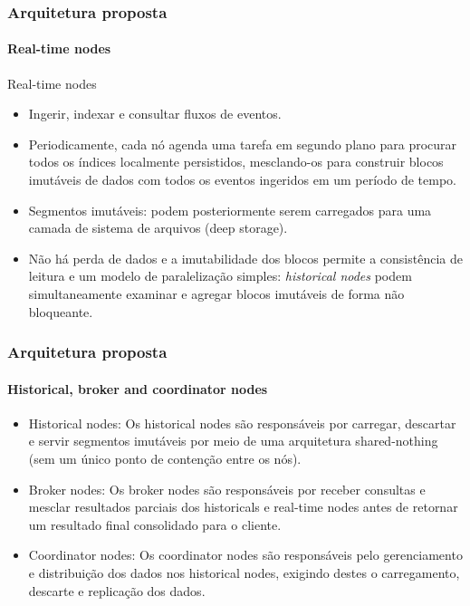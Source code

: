 \documentclass{beamer}
\begin{document}
\begin{frame}
\frametitle{Arquitetura proposta}
\framesubtitle{Real-time nodes}
\alert{Real-time nodes}
\begin{itemize}
\item Ingerir, indexar e consultar fluxos de eventos. 
\item Periodicamente, cada nó agenda uma tarefa em segundo plano para procurar todos os índices localmente persistidos, mesclando-os para construir blocos imutáveis de dados com todos os eventos ingeridos em um período de tempo.
\item Segmentos imutáveis: podem posteriormente serem carregados para uma camada de sistema de arquivos (deep storage).
\item Não há perda de dados e a imutabilidade dos blocos permite a consistência de leitura e um modelo de paralelização simples: \textit{historical nodes} podem simultaneamente examinar e agregar blocos imutáveis de forma não bloqueante.
\end{itemize}
\end{frame}
\begin{frame}
\frametitle{Arquitetura proposta}
\framesubtitle{Historical, broker and coordinator nodes}
\begin{itemize}
    \item \alert{Historical nodes}: Os historical nodes são responsáveis por carregar, descartar e servir segmentos imutáveis por meio de uma arquitetura shared-nothing (sem um único ponto de contenção entre os nós).
    \item\alert{Broker nodes}: Os broker nodes são responsáveis por receber consultas e mesclar resultados parciais dos historicals e real-time nodes antes de retornar um resultado final consolidado para o cliente.
    \item \alert{Coordinator nodes}: Os coordinator nodes são responsáveis pelo gerenciamento e distribuição dos dados nos historical nodes, exigindo destes o carregamento, descarte e replicação dos dados.
\end{itemize}
\end{frame}
\end{document}
